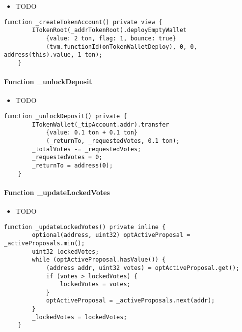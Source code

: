 \begin{itemize}
\item TODO
\end{itemize}

\begin{lstlisting}[firstnumber=197]
    function _createTokenAccount() private view {
        ITokenRoot(_addrTokenRoot).deployEmptyWallet
            {value: 2 ton, flag: 1, bounce: true}
            (tvm.functionId(onTokenWalletDeploy), 0, 0, address(this).value, 1 ton);
    }
\end{lstlisting}

\paragraph{Function \_{}unlockDeposit}

\begin{itemize}
\item TODO
\end{itemize}

\begin{lstlisting}[firstnumber=146]
    function _unlockDeposit() private {
        ITokenWallet(_tipAccount.addr).transfer
            {value: 0.1 ton + 0.1 ton}
            (_returnTo, _requestedVotes, 0.1 ton);
        _totalVotes -= _requestedVotes;
        _requestedVotes = 0;
        _returnTo = address(0);
    }
\end{lstlisting}

\paragraph{Function \_{}updateLockedVotes}

\begin{itemize}
\item TODO
\end{itemize}

\begin{lstlisting}[firstnumber=155]
    function _updateLockedVotes() private inline {
        optional(address, uint32) optActiveProposal = _activeProposals.min();
        uint32 lockedVotes;
        while (optActiveProposal.hasValue()) {
            (address addr, uint32 votes) = optActiveProposal.get();
            if (votes > lockedVotes) {
                lockedVotes = votes;
            }
            optActiveProposal = _activeProposals.next(addr);
        }
        _lockedVotes = lockedVotes;
    }
\end{lstlisting}
